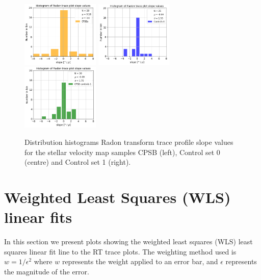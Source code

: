 \documentclass[fleqn,usenatbib]{mnras}
\begin{document}
\begin{figure}
    \centering
    \includegraphics[width=0.33\textwidth]{Images/LINFITS/CPSB-LINFIT-HISTO.png}
    \includegraphics[width=0.33\textwidth]{Images/LINFITS/CC0-LINFIT-HISTO.png}
    \includegraphics[width=0.33\textwidth]{Images/LINFITS/CC1-LINFIT-HISTO.png}
    \caption{Distribution histograms Radon transform trace profile slope values for the stellar velocity map samples CPSB (left), Control set 0 (centre) and Control set 1 (right).}
    \label{fig:Radon-traces-LINFIT-slope-distribution-histos}
\end{figure}

\section{Weighted Least Squares (WLS) linear fits}

In this section we present plots showing the weighted least squares (WLS) least squares linear fit line to the RT trace plots. The weighting method used is $w = 1/\epsilon^2$ where $w$ represents the weight applied to an error bar, and $\epsilon$ represents the magnitude of the error.
\end{document}
